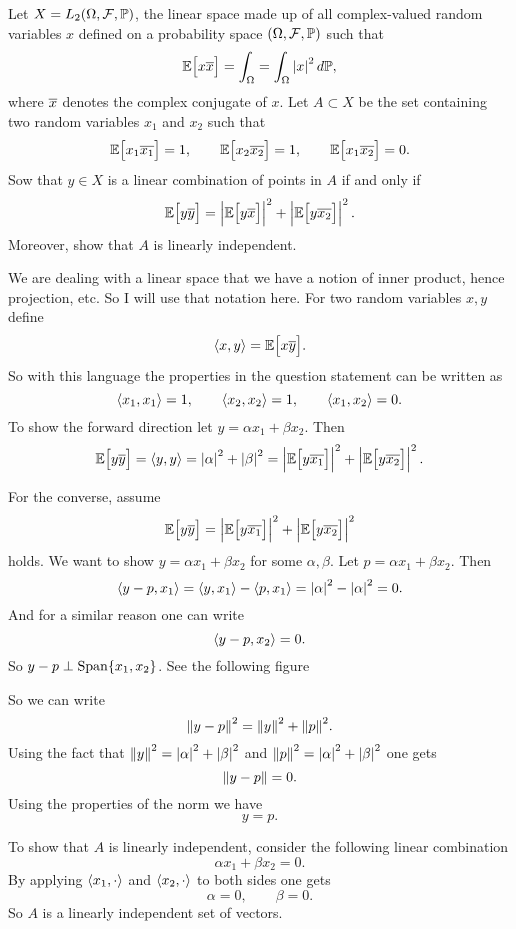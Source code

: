 \begin{problem}
	Let $ X = L_2(\Omega,\mathcal{F},\mathbb{P}) $, the linear space made up of all complex-valued random variables $ x $ defined on a probability space $ (\Omega, \mathcal{F}, \mathbb{P}) $ such that 
	\[ \mathbb{E}\big[x\overline{x}\big] = \int_\Omega = \int_\Omega \left|x\right|^2 d\mathbb{P}, \]
	where $ \overline{x} $ denotes the complex conjugate of $ x $. Let $ A\subset X $ be the set containing two random variables $ x_1 $ and $ x_2 $ such that
	\[ \mathbb{E}\big[x_1\overline{x_1}\big] = 1, \qquad \mathbb{E}\big[x_2\overline{x_2}\big] = 1, \qquad \mathbb{E}\big[x_1\overline{x_2}\big] = 0.  \]
	Sow that $ y \in X $ is a linear combination of points in $ A $ if and only if 
	\[ \mathbb{E}\big[y\overline{y}\big] = \left|\mathbb{E}\big[y\overline{x}\big]\right|^2 + \left|\mathbb{E}\big[y\overline{x_2}\big]\right|^2. \]
	Moreover, show that $ A $ is linearly independent.
\end{problem}
\begin{solution}
	We are dealing with a linear space that we have a notion of inner product, hence projection, etc. So I will use that notation here. For two random variables $ x,y $ define
	\[ \langle x, y\rangle = \mathbb{E}\big[x\overline{y}\big]. \]
	So with this language the properties in the question statement can be written as
	\[ \langle x_1, x_1\rangle = 1, \qquad \langle x_2, x_2\rangle=1, \qquad \langle x_1, x_2\rangle=0.  \]
	To show the forward direction let $ y = \alpha x_1 + \beta x_2 $. Then 
	\[ \mathbb{E}\big[y\overline{y}\big] = \langle y, y\rangle = \left|\alpha\right|^2 + \left|\beta\right|^2 = \left|\mathbb{E}\big[y\overline{x_1}\big]\right|^2 + \left|\mathbb{E}\big[y\overline{x_2}\big]\right|^2. \]
	
	For the converse, assume
	\[ \mathbb{E}\big[y\overline{y}\big] = \left|\mathbb{E}\big[y\overline{x_1}\big]\right|^2 + \left|\mathbb{E}\big[y\overline{x_2}\big]\right|^2 \]
	holds. We want to show $ y = \alpha x_1 + \beta x_2 $ for some $ \alpha, \beta $. Let $ p = \alpha x_1 + \beta x_2 $. Then
	\[ \langle y-p, x_1\rangle = \langle y, x_1\rangle - \langle p, x_1\rangle = \left|\alpha\right|^2  - \left|\alpha\right|^2 = 0. \]
	And for a similar reason one can write
	\[ \langle y-p, x_2\rangle = 0. \]
	So $ y-p \perp \operatorname{Span}\{x_1,x_2\} $. See the following figure
	
	
	So we can write
	\[ \norm{y-p}^2 = \norm{y}^2 + \norm{p}^2. \]
	Using the fact that $ \norm{y}^2 = \left|\alpha\right|^2 + \left|\beta\right|^2 $ and $ \norm{p}^2 = \left|\alpha\right|^2 + \left|\beta\right|^2 $ one gets
	\[ \norm{y-p} = 0. \]
	Using the properties of the norm we have
	\[ y= p. \]
	
	To show that $ A $ is linearly independent, consider the following linear combination
	\[ \alpha x_1 + \beta x_2 = 0. \]
	By applying $ \langle x_1, \cdot\rangle $ and $ \langle x_2, \cdot\rangle $ to both sides one gets
	\[ \alpha =0, \qquad \beta = 0. \]
	So $ A $ is a linearly independent set of vectors. 
\end{solution}

